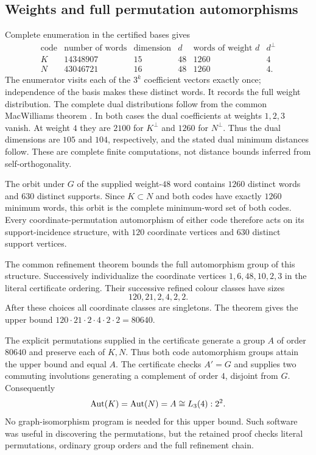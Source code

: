 \subsection{Weights and full permutation automorphisms}
Complete enumeration in the certified bases gives
\[
\begin{array}{c|r|r|r|r|r}
\text{code}&\text{number of words}&\text{dimension}&d&\text{words of weight }d&d^\perp\\\hline
K&14348907&15&48&1260&4\\
N&43046721&16&48&1260&4.
\end{array}
\]
The enumerator visits each of the $3^k$ coefficient vectors exactly once;
independence of the basis makes these distinct words. It records the full
weight distribution. The complete dual distributions follow from the common MacWilliams theorem \cite[Theorem~7.1]{U}. 
In both
cases the dual coefficients at weights $1,2,3$ vanish. At weight $4$ they are
$2100$ for $K^\perp$ and $1260$ for $N^\perp$. Thus the dual dimensions are $105$
and $104$, respectively, and the stated dual minimum distances follow.
These are complete finite computations, not distance bounds inferred from
self-orthogonality.

The orbit under $G$ of the supplied weight-$48$ word contains $1260$ distinct
words and $630$ distinct supports. Since $K\subset N$ and both codes have
exactly $1260$ minimum words, this orbit is the complete minimum-word set of
both codes. Every coordinate-permutation automorphism of either code
therefore acts on its support-incidence structure, with $120$ coordinate
vertices and $630$ distinct support vertices.

The common refinement theorem \cite[Theorem~6.4]{U} bounds the full automorphism group of this structure. 
Successively individualize the coordinate vertices
$1,6,48,10,2,3$ in the literal certificate ordering. Their successive
refined colour classes have sizes
\[
120,21,2,4,2,2.
\]
After these choices all coordinate classes are singletons. The theorem gives the upper bound $120\cdot21\cdot2\cdot4\cdot2\cdot2=80640$.

The explicit permutations supplied in the certificate generate a group
$A$ of order $80640$ and preserve each of $K,N$. Thus both code automorphism
groups attain the upper bound and equal $A$. The certificate checks
$A'=G$ and supplies two commuting involutions generating a complement of
order $4$, disjoint from $G$. Consequently
\[
 \operatorname{Aut}(K)=\operatorname{Aut}(N)=A\cong L_3(4):2^2.
\]
No graph-isomorphism program is needed for this upper bound. Such software
was useful in discovering the permutations, but the retained proof checks
literal permutations, ordinary group orders and the full refinement chain.

